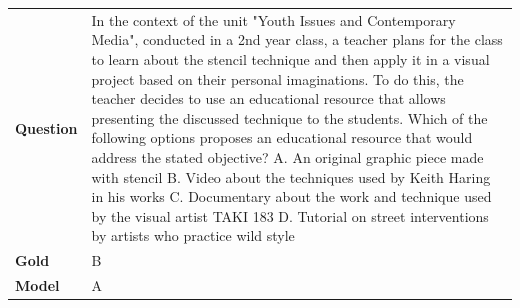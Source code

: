 \begin{longtable}{@{}l p{13cm}@{}}
  \textbf{Question}  & In the context of the unit "Youth Issues and Contemporary Media", conducted in a 2nd year class, a teacher plans for the class to learn about the stencil technique and then apply it in a visual project based on their personal imaginations. To do this, the teacher decides to use an educational resource that allows presenting the discussed technique to the students. Which of the following options proposes an educational resource that would address the stated objective? \newline A. An original graphic piece made with stencil \newline B. Video about the techniques used by Keith Haring in his works \newline C. Documentary about the work and technique used by the visual artist TAKI 183 \newline D. Tutorial on street interventions by artists who practice wild style   \\
  \textbf{Gold}      & B       \\
  \textbf{Model}     & A  \\

\end{longtable}
